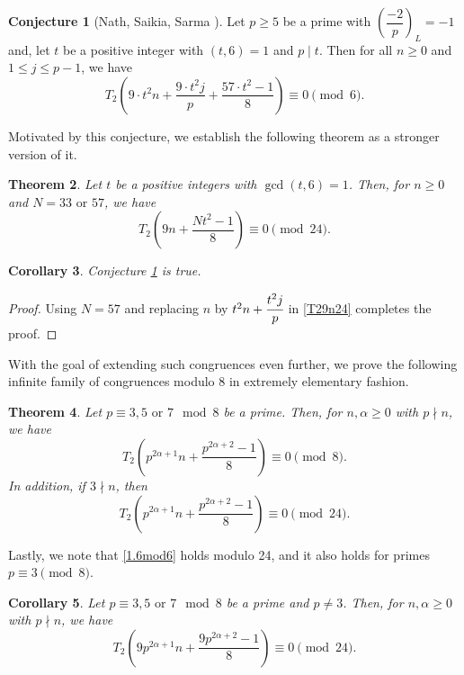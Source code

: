 \documentclass{amsart}
\newtheorem{theorem}{Theorem}[section]
\newtheorem{corollary}[theorem]{Corollary}
\theoremstyle{definition}
\newtheorem{conjecture}[theorem]{Conjecture}
\begin{document}
\begin{conjecture}[Nath, Saikia, Sarma \cite{Nath-Saikia-Sarma}]\label{conj.nss}
	Let $p\geq 5$ be a prime with $\left( \dfrac{-2}{p} \right)_{L}=-1$ and, let $t$ be a positive integer with $(t,6) = 1$ and $p\mid t$. Then for all $n\geq 0$ and $1\leq j \leq p-1$, we have 
	\begin{equation*}
		T_2\left( 9\cdot t^2n + \frac{9\cdot t^2j}{p} + \frac{57\cdot t^2-1}{8} \right) \equiv 0 \pmod{6}.
	\end{equation*}
\end{conjecture}

Motivated by this conjecture, we establish the following theorem as a stronger version of it.


\begin{theorem} \label{thm.nssconj}
    Let $t$ be a positive integers with $\gcd(t,6)=1$. Then, for $n\geq 0$ and $N=33 \text{ or } 57$, we have 
    \begin{equation}\label{T29n24}
        T_2\left(9n+\frac{Nt^2-1}{8}\right)\equiv 0\pmod{24}.
        \end{equation}
\end{theorem}
\begin{corollary}
    Conjecture \ref{conj.nss} is true. 
\end{corollary}
\begin{proof}
    Using $N=57$ and replacing $n$ by $t^2n+\cfrac{t^2j}{p}$ in \eqref{T29n24} completes the proof.
\end{proof}

With the goal of extending such congruences even further, we prove the following infinite family of congruences modulo 8 in extremely elementary fashion. 

\begin{theorem}\label{thm.p357mod8}
	Let $p\equiv3, 5 \text{ or } 7\mod 8$ be a prime. Then, for $n,\alpha\geq 0$ with $p\nmid n$, we have $$T_2\left(p^{2\alpha+1}n+\frac{p^{2\alpha+2}-1}{8}\right)\equiv0\pmod{8}.$$
In addition, if $3\nmid n$, then 
\begin{equation}\label{mod24}
T_2\left(p^{2\alpha+1}n+\frac{p^{2\alpha+2}-1}{8}\right)\equiv0\pmod{24}.\end{equation}
\end{theorem}


Lastly, we note that \eqref{1.6mod6} holds modulo 24, and it also holds for primes $p\equiv3\pmod{8}$.

\begin{corollary}\label{cor.9pmod24}
    Let $p\equiv 3, 5 \text{ or } 7\mod 8$ be a prime and $p\ne 3$. Then, for $n,\alpha\geq 0$ with $p\nmid n$, we have $$T_2\left(9p^{2\alpha+1}n+\frac{9p^{2\alpha+2}-1}{8}\right)\equiv0\pmod{24}.$$
\end{corollary}
\end{document}
